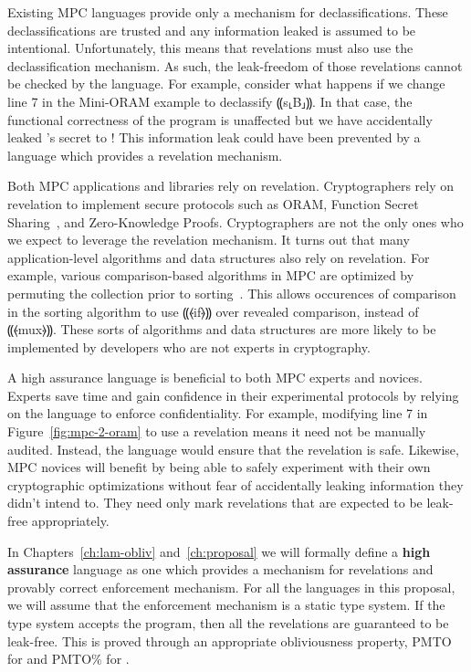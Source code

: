 Existing MPC languages provide only a mechanism for declassifications. These declassifications are trusted and any
information leaked is assumed to be intentional. Unfortunately, this means that revelations must also use the
declassification mechanism. As such, the leak-freedom of those revelations cannot be checked
by the language. For example, consider what happens if we change line 7 in the Mini-ORAM example to declassify ⸨s⸤B⸥⸩.
In that case, the functional correctness of the program is unaffected but we have accidentally leaked \bob's secret to \alice!
This information leak could have been prevented by a language which provides a revelation mechanism.

Both MPC applications and libraries rely on revelation. Cryptographers rely on revelation to implement secure protocols such as ORAM,
Function Secret Sharing~\cite{}, and Zero-Knowledge Proofs\cite{}. Cryptographers are not the only ones who we expect to leverage the
revelation mechanism. It turns out that many application-level algorithms and data structures also rely on revelation. For example,
various comparison-based algorithms in MPC are optimized by permuting the collection prior to sorting~\cite{hamada2012}. This allows occurences of
comparison in the sorting algorithm to use ⸨⦑if⦒⸩ over revealed comparison, instead of ⸨⦑mux⦒⸩. These sorts of algorithms and
data structures are more likely to be implemented by developers who are not experts in cryptography.

A high assurance language is beneficial to both MPC experts and novices. Experts save time and gain confidence in their
experimental protocols by relying on the language to enforce confidentiality. For example, modifying line 7 in
Figure~\ref{fig:mpc-2-oram} to use a revelation means it need not be manually audited. Instead, the language would ensure that the
revelation is safe. Likewise, MPC novices will benefit by being able to safely experiment with their own cryptographic optimizations
without fear of accidentally leaking information they didn't intend to. They need only mark revelations that are expected to be
leak-free appropriately.

In Chapters~\ref{ch:lam-obliv} and~\ref{ch:proposal} we will formally define a \textbf{high assurance} language as one which provides
a mechanism for revelations and provably correct enforcement mechanism. For all the languages in this proposal, we will
assume that the enforcement mechanism is a static type system. If the type system accepts the program, then all the revelations
are guaranteed to be leak-free. This is proved through an appropriate obliviousness property, PMTO for \obliv and PMTO\% for \lang.


